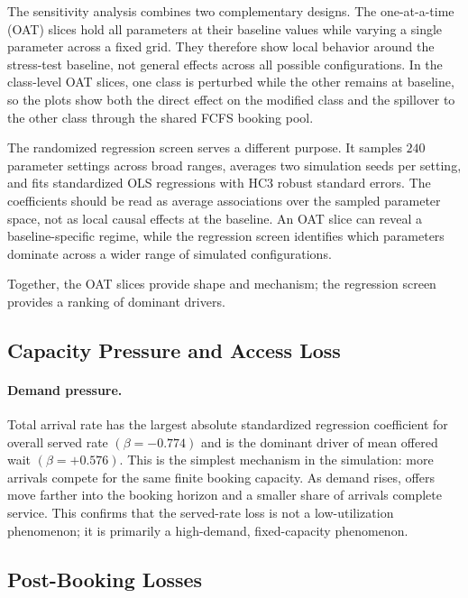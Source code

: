 \documentclass[11pt]{article}
\begin{document}
The sensitivity analysis combines two complementary designs. The
one-at-a-time (OAT) slices hold all parameters at their baseline values while
varying a single parameter across a fixed grid. They therefore show local
behavior around the stress-test baseline, not general effects across all
possible configurations. In the class-level OAT slices, one class is perturbed
while the other remains at baseline, so the plots show both the direct effect
on the modified class and the spillover to the other class through the shared
FCFS booking pool.

The randomized regression screen serves a different purpose. It samples
\(240\) parameter settings across broad ranges, averages two simulation seeds
per setting, and fits standardized OLS regressions with HC3 robust standard
errors. The coefficients should be read as average associations over the
sampled parameter space, not as local causal effects at the baseline. An OAT
slice can reveal a baseline-specific regime, while the regression screen
identifies which parameters dominate across a wider range of simulated
configurations.

Together, the OAT slices provide shape and mechanism; the regression screen
provides a ranking of dominant drivers.

\subsection{Capacity Pressure and Access Loss}

\paragraph{Demand pressure.}
Total arrival rate has the largest absolute standardized regression
coefficient for overall served rate \((\beta=-0.774)\) and is the dominant
driver of mean offered wait \((\beta=+0.576)\). This is the simplest
mechanism in the simulation: more arrivals compete for the same finite booking
capacity. As demand rises, offers move farther into the booking horizon and a
smaller share of arrivals complete service. This confirms that the served-rate
loss is not a low-utilization phenomenon; it is primarily a high-demand,
fixed-capacity phenomenon.

\subsection{Post-Booking Losses}
\end{document}
